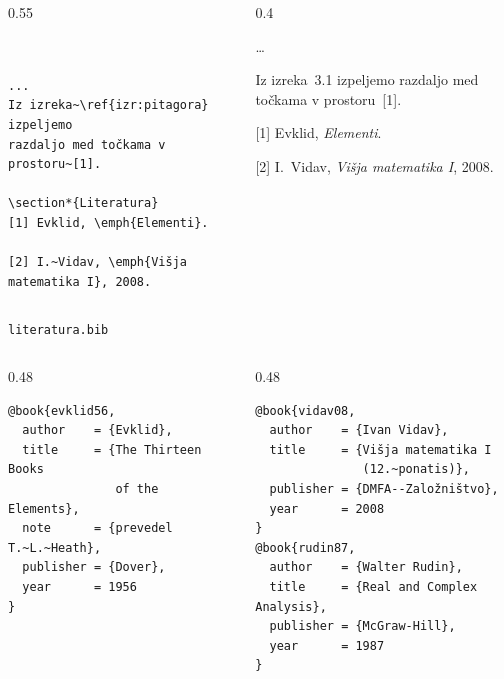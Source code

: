 \documentclass[aspectratio=169]{beamer}
\newcommand{\razdelek}[2]{\par\smallskip{\large\bfseries #1\quad #2}\par\smallskip}
\begin{document}
\begin{frame}[fragile]{}
  \begin{columns}[T]
    \begin{column}{0.55\textwidth}
      \begin{verbatim}


...
Iz izreka~\ref{izr:pitagora} izpeljemo
razdaljo med točkama v prostoru~[1].

\section*{Literatura}
[1] Evklid, \emph{Elementi}.

[2] I.~Vidav, \emph{Višja matematika I}, 2008.
      \end{verbatim}
    \end{column}
    \begin{column}{0.4\textwidth}
      \footnotesize

      \dots

      Iz izreka~3.1 izpeljemo razdaljo med točkama v prostoru~[1].
      \razdelek{}{Literatura}
      \alert{[1] Evklid, \emph{Elementi}.}

      [2] I.~Vidav, \emph{Višja matematika I}, 2008.
    \end{column}
  \end{columns}
\end{frame}

\begin{frame}[fragile]{\texttt{literatura.bib}}
  \begin{columns}[T]
    \begin{column}{0.48\textwidth}
      \begin{verbatim}
@book{evklid56,
  author    = {Evklid},
  title     = {The Thirteen Books
               of the Elements},
  note      = {prevedel T.~L.~Heath},
  publisher = {Dover},
  year      = 1956
}
      \end{verbatim}
    \end{column}
    \begin{column}{0.48\textwidth}
      \begin{verbatim}
@book{vidav08,
  author    = {Ivan Vidav},
  title     = {Višja matematika I
               (12.~ponatis)},
  publisher = {DMFA--Založništvo},
  year      = 2008
}
@book{rudin87,
  author    = {Walter Rudin},
  title     = {Real and Complex Analysis},
  publisher = {McGraw-Hill},
  year      = 1987
}
      \end{verbatim}
    \end{column}
  \end{columns}
\end{frame}
\end{document}
